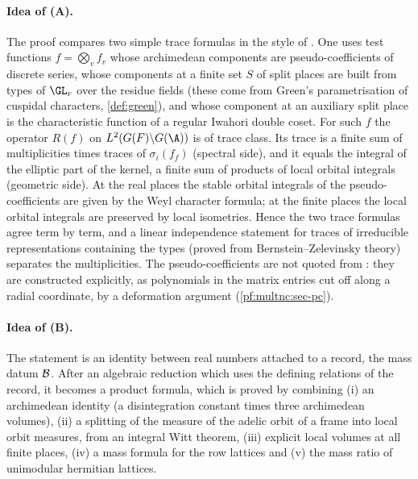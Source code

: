 \paragraph{Idea of (A).} The proof compares two simple trace formulas in the style of
\cite{DeligneKazhdanVigneras1984,Arthur1989}. One uses test functions $f=\bigotimes_vf_v$ whose archimedean components
are pseudo-coefficients of discrete series, whose components at a finite set $S$ of split places are built from types of
$\GL_r$ over the residue fields (these come from Green's parametrisation of cuspidal characters, \cref{def:green}), and
whose component at an auxiliary split place is the characteristic function of a regular Iwahori double coset. For such
$f$ the operator $R(f)$ on $L^2(G(F)\backslash G(\A))$ is of trace class. Its trace is a finite sum of multiplicities
times traces of $\sigma_i(f_f)$ (spectral side), and it equals the integral of the elliptic part of the kernel, a finite
sum of products of local orbital integrals (geometric side). At the real places the stable orbital integrals of the
pseudo-coefficients are given by the Weyl character formula; at the finite places the local orbital integrals are
preserved by local isometries. Hence the two trace formulas agree term by term, and a linear independence statement for
traces of irreducible representations containing the types (proved from Bernstein--Zelevinsky theory) separates the
multiplicities. The pseudo-coefficients are not quoted from \cite{ClozelDelorme1984}: they are constructed explicitly,
as polynomials in the matrix entries cut off along a radial coordinate, by a deformation argument
(\cref{pf:multnc:sec-pc}).

\paragraph{Idea of (B).} The statement is an identity between real numbers attached to a record, the mass datum
$\mathcal{B}$. After an algebraic reduction which uses the defining relations of the record, it becomes a product formula,
which is proved by combining (i) an archimedean identity (a disintegration constant times three archimedean volumes),
(ii) a splitting of the measure of the adelic orbit of a frame into local orbit measures, from an integral Witt theorem,
(iii) explicit local volumes at all finite places, (iv) a mass formula for the row lattices and (v) the mass ratio of
unimodular hermitian lattices.

